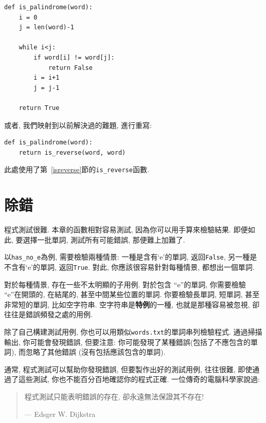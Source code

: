 \documentclass[10pt]{book}
\begin{document}
\begin{verbatim}
def is_palindrome(word):
    i = 0
    j = len(word)-1

    while i<j:
        if word[i] != word[j]:
            return False
        i = i+1
        j = j-1

    return True
\end{verbatim}

或者, 我們映射到以前解決過的難題, 進行重寫:

\begin{verbatim}
def is_palindrome(word):
    return is_reverse(word, word)
\end{verbatim}
%
此處使用了第~\ref{isreverse}節的\verb"is_reverse"函數.


\section{除錯}

程式測試很難. 本章的函數相對容易測試, 因為你可以用手算來檢驗結果. 
即便如此, 要選擇一批單詞, 測試所有可能錯誤, 那便難上加難了. 

以\verb"has_no_e"為例, 需要檢驗兩種情景: 一種是含有`e'的單詞, 返回{\tt False}, 
另一種是不含有`e'的單詞, 返回{\tt True}. 
對此, 你應該很容易針對每種情景, 都想出一個單詞. 

對於每種情景, 存在一些不太明顯的子用例. 
對於包含 ``e''的單詞, 你需要檢驗 ``e''在開頭的, 在結尾的, 甚至中間某些位置的單詞. 
你要檢驗長單詞, 短單詞, 甚至非常短的單詞, 比如空字符串. 
空字符串是{\bf 特例}的一種, 也就是那種容易被忽視, 卻往往是錯誤頻發之處的用例. 

除了自己構建測試用例, 你也可以用類似{\tt words.txt}的單詞串列檢驗程式. 
通過掃描輸出, 你可能會發現錯誤, 但要注意: 
你可能發現了某種錯誤(包括了不應包含的單詞), 而忽略了其他錯誤
(沒有包括應該包含的單詞). 

通常, 程式測試可以幫助你發現錯誤, 但要製作出好的測試用例, 
往往很難, 即使通過了這些測試, 你也不能百分百地確認你的程式正確. 
一位傳奇的電腦科學家說過:

\begin{quote}

程式測試只能表明錯誤的存在, 卻永遠無法保證其不存在!

--- Edsger W. Dijkstra
\end{quote}
\end{document}
